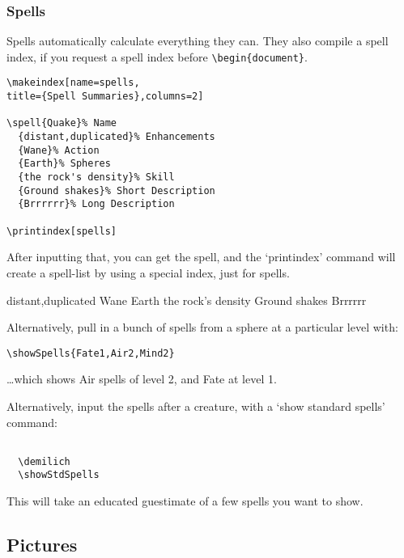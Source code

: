 \documentclass[a4paper,openany]{book}
\begin{document}
\begin{multicols}{2}
\subsubsection{Spells}

Spells automatically calculate everything they can.
They also compile a spell index, if you request a spell index before \verb"\begin{document}".

\begin{verbatim}
\makeindex[name=spells,
title={Spell Summaries},columns=2]

\spell{Quake}% Name
  {distant,duplicated}% Enhancements
  {Wane}% Action
  {Earth}% Spheres
  {the rock's density}% Skill
  {Ground shakes}% Short Description
  {Brrrrrr}% Long Description

\printindex[spells]
\end{verbatim}

After inputting that, you can get the spell, and the `printindex' command will create a spell-list by using a special index, just for spells.

  {distant,duplicated}%
  {Wane}%
  {Earth}%
  {the rock's density}%
  {Ground shakes}%
  {Brrrrrr}%

Alternatively, pull in a bunch of spells from a sphere at a particular level with:

\verb"\showSpells{Fate1,Air2,Mind2}"


\ldots which shows Air spells of level 2, and Fate at level 1.

Alternatively, input the spells after a creature, with a `show standard spells' command:

\begin{verbatim}

  \demilich
  \showStdSpells

\end{verbatim}

This will take an educated guestimate of a few spells you want to show.

\demilich

\showStdSpells

\subsection{Pictures}



\end{multicols}
\end{document}
